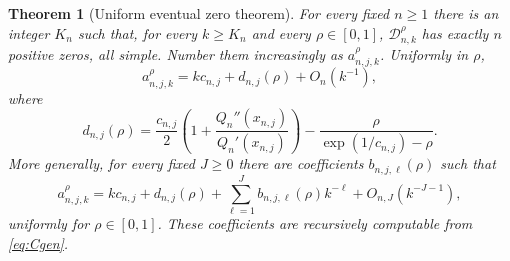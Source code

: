 \documentclass[11pt]{article}
\newtheorem{theorem}{Theorem}[section]
\theoremstyle{definition}
\theoremstyle{remark}
\newcommand{\D}{\mathcal D}
\begin{document}
\begin{theorem}[Uniform eventual zero theorem]\label{thm:zeroasympt}
For every fixed $n\geq1$ there is an integer $K_n$ such that, for every $k\geq K_n$ and every $\rho\in[0,1]$, $\D_{n,k}^{\rho}$ has exactly $n$ positive zeros, all simple. Number them increasingly as $a_{n,j,k}^{\rho}$. Uniformly in $\rho$,
\begin{equation}\label{eq:zero2}
 a_{n,j,k}^{\rho}=kc_{n,j}+d_{n,j}(\rho)+O_n(k^{-1}),
\end{equation}
where
\begin{equation}\label{eq:offset}
 d_{n,j}(\rho)=\frac{c_{n,j}}2
   \left(1+\frac{Q_n''(x_{n,j})}{Q_n'(x_{n,j})}\right)
       -\frac{\rho}{\exp(1/c_{n,j})-\rho}.
\end{equation}
More generally, for every fixed $J\geq0$ there are coefficients $b_{n,j,\ell}(\rho)$ such that
\begin{equation}\label{eq:zeroall}
 a_{n,j,k}^{\rho}=kc_{n,j}+d_{n,j}(\rho)
   +\sum_{\ell=1}^J b_{n,j,\ell}(\rho)k^{-\ell}
   +O_{n,J}(k^{-J-1}),
\end{equation}
uniformly for $\rho\in[0,1]$. These coefficients are recursively computable from \eqref{eq:Cgen}.
\end{theorem}
\end{document}
